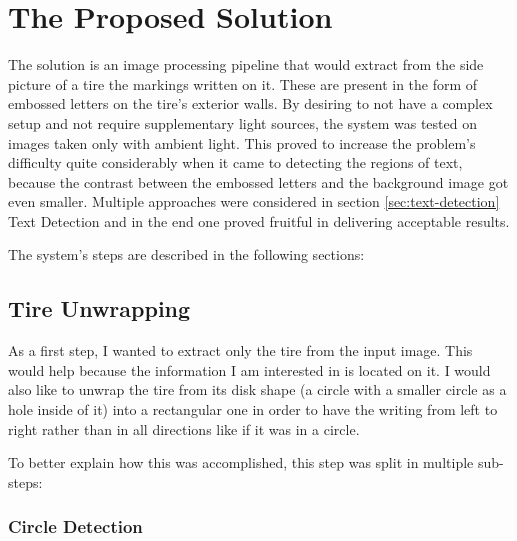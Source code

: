 \chapter{The Proposed Solution}\pagestyle{fancy}\setlength{\parindent}{3em}
\label{chap:proposed-solution}

The solution is an image processing pipeline that would extract from the side picture of a tire the markings written on it. These are present in the form of embossed letters on the tire's exterior walls. By desiring to not have a complex setup and not require supplementary light sources, the system was tested on images taken only with ambient light. This proved to increase the problem's difficulty quite considerably when it came to detecting the regions of text, because the contrast between the embossed letters and the background image got even smaller. Multiple approaches were considered in section \ref{sec:text-detection} Text Detection and in the end one proved fruitful in delivering acceptable results.

The system's steps are described in the following sections:

\section{Tire Unwrapping}\label{sec:tire-unwrapping}

As a first step, I wanted to extract only the tire from the input image. This would help because the information I am interested in is located on it. I would also like to unwrap the tire from its disk shape (a circle with a smaller circle as a hole inside of it) into a rectangular one in order to have the writing from left to right rather than in all directions like if it was in a circle.

To better explain how this was accomplished, this step was split in multiple sub-steps:

\subsection{Circle Detection}

